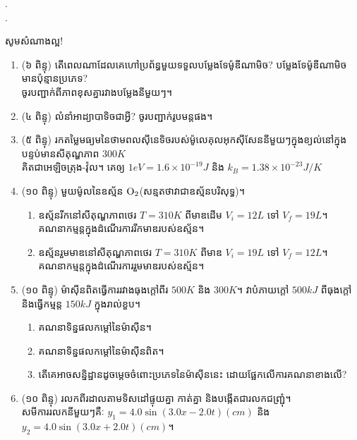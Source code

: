 \documentclass{officialexam}
\begin{document}
{\color{white}.}\dotfill
\\
{\color{white}.}\dotfill
\begin{center}
	\sffamily\color{blue}
	សូមសំណាងល្អ!
\end{center}\newpage
\maketitle
\begin{enumerate}[m]
	\item {\color{khtug}\kml(៦ ពិន្ទុ)} តើពេលណាដែលគេហៅប្រព័ន្ធមួយទទួលបម្លែងទែម៉ូឌីណាមិច? បម្លែងទែម៉ូឌីណាមិចមានប៉ុន្មានប្រភេទ?\\ ចូរបញ្ជាក់ពីភាពខុសគ្នារវាងបម្លែងនីមួយៗ។
	\item {\color{khtug}\kml(៤ ពិន្ទុ)} លំនាំអាដ្យាបាទិចជាអ្វី? ចូរបញ្ជាក់រូបមន្តផង។
	\item {\color{khtug}\kml(៥ ពិន្ទុ)} រកតម្លៃមធ្យមនៃថាមពលសុីនេទិចរបស់ម៉ូលេគុលអុកសុីសែននីមួយៗក្នុងខ្យល់នៅក្នុងបន្ទប់មានសីតុណ្ហភាព $300K$ \\គិតជាអេឡិចត្រុង-វ៉ុល។ គេឲ្យ $1eV=1.6\times10^{-19}J$ និង $k_{B}=1.38\times10^{-23}J/K$
	\item {\color{khtug}\kml(១០ ពិន្ទុ)} មួយម៉ូលនៃឧស្ម័ន $\ce{O2}$(សន្មតថាវាជាឧស្ម័នបរិសុទ្ធ)។
	\begin{enumerate}[k]
		\item ឧស្ម័នរីកនៅសីតុណ្ហភាពថេរ $T=310K$ ពីមាឌដើម $V_i=12L$ ទៅ $V_f=19L$។\\
		គណនាកម្មន្តក្នុងដំណើរការរីកមាឌរបស់ឧស្ម័ន។
		\item ឧស្ម័នរួមមាឌនៅសីតុណ្ហភាពថេរ $T=310K$ ពីមាឌ $V_{i}=19L$ ទៅ $V_{f}=12L$។\\
		គណនាកម្មន្តក្នុងដំណើរការរួមមាឌរបស់ឧស្ម័ន។
	\end{enumerate}
	\item {\color{khtug}\kml(១០ ពិន្ទុ)} ម៉ាសុីនពិតធ្វើការរវាងធុងក្តៅពីរ $500K$ និង $300K$។ វាបំភាយក្តៅ $500kJ$ ពីធុងក្តៅ និងធ្វើកម្មន្ត
	$150kJ$ ក្នុងរាល់ខួប។
	\begin{enumerate}[k]
		\item គណនាទិន្នផលកម្តៅនៃម៉ាសុីន។
		\item គណនាទិន្នផលកម្តៅនៃម៉ាសុីនពិត។
		\item តើគេអាចសន្និដ្ឋានដូចម្តេចចំពោះប្រភេទនៃម៉ាសុីននេះ ដោយផ្អែកលើការគណនាខាងលើ? 
	\end{enumerate}
	\item {\color{khtug}\kml(១០ ពិន្ទុ)} រលកពីរដាលតាមទិសដៅផ្ទុយគ្នា កាត់គ្នា និងបង្កើតជារលកជញ្ជ្រុំ។ \\សមីការរលកនីមួយៗគឺៈ $y_1=4.0\sin\left(3.0x-2.0t\right)\left(cm\right)$ និង $y_2=4.0\sin\left(3.0x+2.0t\right)\left(cm\right)$។

\end{enumerate}
\end{document}
